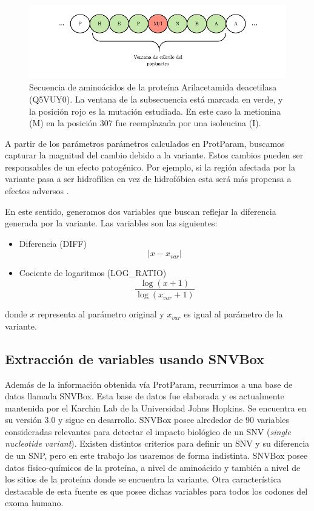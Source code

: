 \begin{figure}[H]
    \centering
    \includegraphics[scale=1.2]{documents/latex/figures/3/structural/protparam.pdf}
    \caption{Secuencia de aminoácidos de la proteína Arilacetamida deacetilasa (Q5VUY0). La ventana de la subsecuencia está marcada en verde, y la posición rojo es la mutación estudiada. En este caso la metionina (M) en la posición 307 fue reemplazada por una isoleucina (I).}
    \label{fig:sequence_window}
\end{figure}

A partir de los parámetros parámetros calculados en ProtParam, buscamos capturar la magnitud del cambio debido a la variante. Estos cambios pueden ser responsables de un efecto patogénico. Por ejemplo, si la región afectada por la variante pasa a ser hidrofílica en vez de hidrofóbica esta será más propensa a efectos adversos \cite{doi:10.1093/bioinformatics/btt308}.

En este sentido, generamos dos variables que buscan reflejar la diferencia generada por la variante. Las variables son las siguientes: 

\begin{itemize}
    \item Diferencia (DIFF) 
    $$|x - x_{var}|$$
    \item Cociente de logaritmos (LOG\_RATIO)
    $$\frac{\log{(x + 1)}}{\log{(x_{var} + 1)}}$$  
\end{itemize}

donde $x$ representa al parámetro original y $x_{var}$ es igual al parámetro de la variante.

\subsection{Extracción de variables usando SNVBox}

Además de la información obtenida vía ProtParam, recurrimos a una base de datos llamada SNVBox. Esta base de datos fue elaborada y es actualmente mantenida por el Karchin Lab de la Universidad Johns Hopkins. Se encuentra en su versión 3.0 y sigue en desarrollo. SNVBox posee alrededor de 90 variables consideradas relevantes para detectar el impacto biológico de un SNV (\textit{single nucleotide variant}). Existen distintos criterios para definir un SNV y su diferencia de un SNP, pero en este trabajo los usaremos de forma indistinta. SNVBox posee datos físico-químicos de la proteína, a nivel de aminoácido y también a nivel de los sitios de la proteína donde se encuentra la variante. Otra característica destacable de esta fuente es que posee dichas variables para todos los codones del exoma humano.

